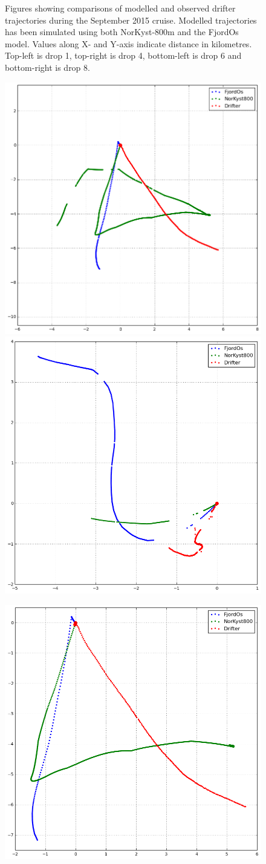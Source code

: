 \begin{figure}[ht]
{}
\caption{\small
Figures showing comparisons of modelled and observed drifter trajectories during the September 2015 cruise. Modelled trajectories has been simulated using both NorKyst-800m and the FjordOs model. Values along X- and Y-axis indicate distance in kilometres. Top-left is drop 1, top-right is drop 4, bottom-left is drop 6 and bottom-right is drop 8.}
\label{fig:opendrift_trajectories1}
\end{figure}

\begin{figure}[ht]
\centerline{
\includegraphics*[width=.5\textwidth]{Figurer/opendrift/skillscore/drop51i4}
\includegraphics*[width=.5\textwidth]{Figurer/opendrift/skillscore/drop52i8}
}
\centerline{
\includegraphics*[width=.5\textwidth]{Figurer/opendrift/skillscore/drop61i5}
}
\end{figure}
